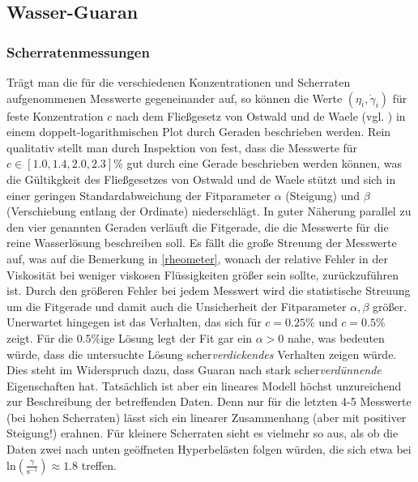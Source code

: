 \documentclass[11pt,a4paper,oneside]{scrartcl}
\begin{document}
\subsection{Wasser-Guaran}

\subsubsection{Scherratenmessungen}\label{guar_mess}
Trägt man die für die verschiedenen Konzentrationen und Scherraten aufgenommenen Messwerte gegeneinander auf, so können die Werte $(\eta_i,\dot\gamma_i)$ für feste Konzentration $c$ nach dem Fließgesetz von Ostwald und de Waele (vgl. \cite{dewiki:192899581}) in einem doppelt-logarithmischen Plot durch Geraden beschrieben werden. 
Rein qualitativ stellt man durch Inspektion von  fest, dass die Messwerte für $c\in[1.0,1.4,2.0,2.3]\%$ gut durch eine Gerade beschrieben werden können, was die Gültikgkeit des Fließgesetzes von Ostwald und de Waele stützt und sich in einer geringen Standardabweichung der Fitparameter $\alpha$ (\glqq Steigung\grqq) und $\beta$ (\glqq Verschiebung entlang der Ordinate\grqq) niederschlägt. In guter Näherung parallel zu den vier genannten Geraden verläuft die Fitgerade, die die Messwerte für die reine Wasserlösung beschreiben soll. Es fällt die große Streuung der Messwerte auf, was auf die Bemerkung in \ref{rheometer}, wonach der relative Fehler in der Viskosität bei weniger viskosen Flüssigkeiten größer sein sollte, zurückzuführen ist. Durch den größeren Fehler bei jedem Messwert wird die statistische Streuung um die Fitgerade und damit auch die Unsicherheit der Fitparameter $\alpha,\beta$ größer. \\
Unerwartet hingegen ist das Verhalten, das sich für $c=0.25\%$ und $c=0.5\%$ zeigt. Für die $0.5\%$ige Lösung legt der Fit gar ein $\alpha>0$ nahe, was bedeuten würde, dass die untersuchte Lösung scher\emph{verdickendes} Verhalten zeigen würde.  Dies steht im Widerspruch dazu, dass Guaran nach \cite{enwiki:1124053245} stark scher\emph{verdünnende} Eigenschaften hat. 
Tatsächlich ist aber ein lineares Modell höchst unzureichend zur Beschreibung der betreffenden Daten. Denn nur für die letzten 4-5 Messwerte (bei hohen Scherraten) lässt sich ein linearer Zusammenhang (aber mit positiver Steigung!) erahnen.  Für kleinere Scherraten sieht es vielmehr so aus, als ob die Daten zwei nach unten geöffneten Hyperbelästen folgen würden, die sich etwa bei $\mathrm{ln}\left(\frac{\dot\gamma}{\mathrm{s}^{-1}}\right)\approx 1.8$ treffen. 
\end{document}
